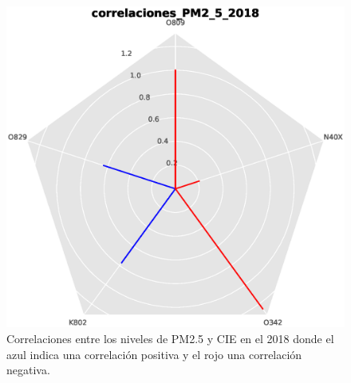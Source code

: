 \begin{figure}[h!]
\setcounter{figure}{7} %
\captionsetup{type=figure} %
\begin{center}
   \includegraphics[trim=0 0 0 23,clip,width=1\textwidth]{spiderweb_correlaciones_PM2_5_2018}
   \end{center}
    \caption[Correlaciones 2018 PM2.5]{Correlaciones entre los niveles de PM2.5 y CIE en el 2018 donde el azul indica una correlación positiva y el rojo una correlación negativa.}
    \label{correlaciones_2018_PM25}
\end{figure}

